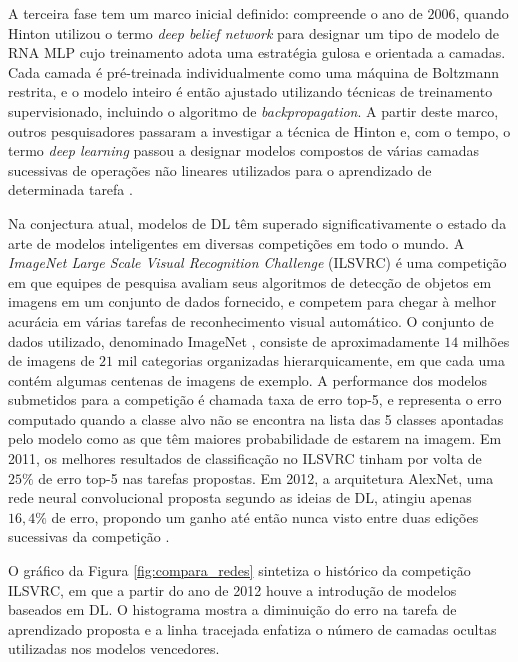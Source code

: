 A terceira fase tem um marco inicial definido: compreende o ano de $2006$, quando Hinton utilizou o termo \emph{deep belief network} para designar um tipo de modelo de RNA MLP cujo treinamento adota uma estratégia gulosa e orientada a camadas. Cada camada é pré-treinada individualmente como uma máquina de Boltzmann restrita, e o modelo inteiro é então ajustado utilizando técnicas de treinamento supervisionado, incluindo o algoritmo de \emph{backpropagation}. A partir deste marco, outros pesquisadores passaram a investigar a técnica de Hinton e, com o tempo, o termo \emph{deep learning} passou a designar modelos compostos de várias camadas sucessivas de operações não lineares utilizados para o aprendizado de determinada tarefa \cite{hinton2006fast, hinton2007learning, goodfellow2016deep, deng2014deep}.

Na conjectura atual, modelos de DL têm superado significativamente o estado da arte de modelos inteligentes em diversas competições em todo o mundo. A \emph{ImageNet Large Scale Visual Recognition Challenge} (ILSVRC) \cite{ImagenetChall} é uma competição em que equipes de pesquisa avaliam seus algoritmos de detecção de objetos em imagens em um conjunto de dados fornecido, e competem para chegar à melhor acurácia em várias tarefas de reconhecimento visual automático. O conjunto de dados utilizado, denominado ImageNet \cite{Imagenet:main}, consiste de aproximadamente $14$ milhões de imagens de $21$ mil categorias organizadas hierarquicamente, em que cada uma contém algumas centenas de imagens de exemplo. A performance dos modelos submetidos para a competição é chamada taxa de erro top-5, e representa o erro computado quando a classe alvo não se encontra na lista das 5 classes apontadas pelo modelo como as que têm maiores probabilidade de estarem na imagem. Em 2011, os melhores resultados de  classificação no ILSVRC tinham por volta de $25\%$ de erro top-5 nas tarefas propostas. Em 2012, a arquitetura AlexNet, uma rede neural convolucional proposta segundo as ideias de DL, atingiu apenas $16,4\%$ de erro, propondo um ganho até então nunca visto entre duas edições sucessivas da competição \cite{ImagenetChall:2012}.

O gráfico da Figura \ref{fig:compara_redes} sintetiza o histórico da competição ILSVRC, em que a partir do ano de 2012 houve a introdução de modelos baseados em DL. O histograma mostra a diminuição do erro na tarefa de aprendizado proposta e a linha tracejada enfatiza o número de camadas ocultas utilizadas nos modelos vencedores. 

